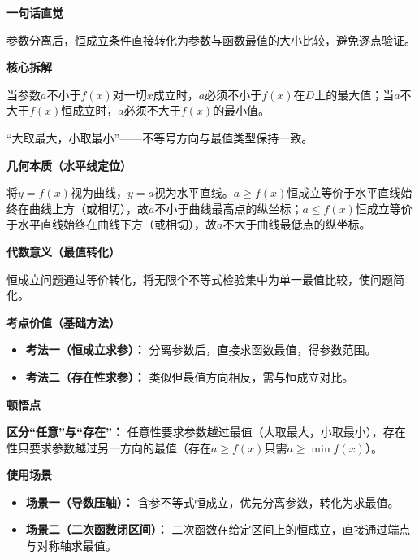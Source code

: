 \begin{explanationbox}
	\textbf{\textcolor{CExplanation}{一句话直觉}}

	参数分离后，恒成立条件直接转化为参数与函数最值的大小比较，避免逐点验证。

	\medskip
	\textbf{\textcolor{CExplanation}{核心拆解}}
	\begin{description}[style=nextline, leftmargin=2.8em, labelsep=0.5em, itemsep=0.45em]
		\item[\textbf{要点一（转化方向）：}] 当参数$a$不小于$f(x)$对一切$x$成立时，$a$必须不小于$f(x)$在$D$上的最大值；当$a$不大于$f(x)$恒成立时，$a$必须不大于$f(x)$的最小值。
		\item[\textbf{要点二（方向记忆）：}] “大取最大，小取最小”——不等号方向与最值类型保持一致。
	\end{description}

	\medskip
	\textbf{\textcolor{CExplanation}{几何本质（水平线定位）}}

	将$y=f(x)$视为曲线，$y=a$视为水平直线。$a\ge f(x)$恒成立等价于水平直线始终在曲线上方（或相切），故$a$不小于曲线最高点的纵坐标；$a\le f(x)$恒成立等价于水平直线始终在曲线下方（或相切），故$a$不大于曲线最低点的纵坐标。

	\medskip
	\textbf{\textcolor{CExplanation}{代数意义（最值转化）}}

	恒成立问题通过等价转化，将无限个不等式检验集中为单一最值比较，使问题简化。

	\medskip
	\textbf{\textcolor{CExplanation}{考点价值（基础方法）}}
	\begin{itemize}[leftmargin=*, itemsep=0.5em, topsep=0.4em]
		\item \textbf{考法一（恒成立求参）：} 分离参数后，直接求函数最值，得参数范围。
		\item \textbf{考法二（存在性求参）：} 类似但最值方向相反，需与恒成立对比。
	\end{itemize}

	\medskip
	\textbf{\textcolor{CExplanation}{顿悟点}}

	\textbf{区分“任意”与“存在”：} 任意性要求参数越过最值（大取最大，小取最小），存在性只要求参数越过另一方向的最值（存在$a\ge f(x)$只需$a\ge\min f(x)$）。

	\medskip
	\textbf{\textcolor{CExplanation}{使用场景}}
	\begin{itemize}[leftmargin=*, itemsep=0.5em, topsep=0.4em]
		\item \textbf{场景一（导数压轴）：} 含参不等式恒成立，优先分离参数，转化为求最值。
		\item \textbf{场景二（二次函数闭区间）：} 二次函数在给定区间上的恒成立，直接通过端点与对称轴求最值。
	\end{itemize}
\end{explanationbox}
